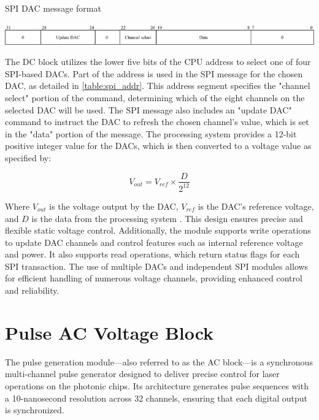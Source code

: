 \begin{table}[h]
\centering

\caption{SPI DAC message format}

\includegraphics[width=1.0\textwidth]{figures/spi_addr.png}
\label{table:spi_addr}
\end{table}

The DC block utilizes the lower five bits of the CPU address to select one of four SPI-based DACs. Part of the address is used in the SPI message for the chosen DAC, as detailed in \autoref{table:spi_addr}. This address segment specifies the "channel select" portion of the command, determining which of the eight channels on the selected DAC will be used. The SPI message also includes an "update DAC" command to instruct the DAC to refresh the chosen channel's value, which is set in the "data" portion of the message. The processing system provides a 12-bit positive integer value for the DACs, which is then converted to a voltage value as specified by:

\begin{equation}
V_{out} = V_{ref} \times \frac{D}{2^{12}}
\end{equation}

Where $V_{out}$ is the voltage output by the DAC, $V_{ref}$ is the DAC's reference voltage, and $D$ is the data from the processing system \cite{ad5628}. This design ensures precise and flexible static voltage control. Additionally, the module supports write operations to update DAC channels and control features such as internal reference voltage and power. It also supports read operations, which return status flags for each SPI transaction. The use of multiple DACs and independent SPI modules allows for efficient handling of numerous voltage channels, providing enhanced control and reliability.

\section{Pulse AC Voltage Block}

The pulse generation module—also referred to as the AC block—is a synchronous multi-channel pulse generator designed to deliver precise control for laser operations on the photonic chips. Its architecture generates pulse sequences with a 10-nanosecond resolution across 32 channels, ensuring that each digital output is synchronized. 

